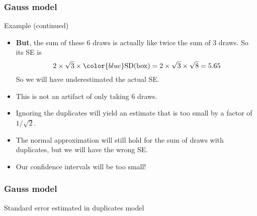 \documentclass[handout]{beamer}
\begin{document}
   \begin{frame} \frametitle{Gauss model}

   \begin{block}
     {Example (continued)}
     \begin{itemize}
     \item {\bf \color{red} But}, the sum of these 6 draws is actually like twice the
     sum of 3 draws. So its SE is
     $$
     2 \times \sqrt{3} \times {\color{blue} \text{SD(box)}} = 2 \times \sqrt{3} \times \sqrt{8} = 5.65
     $$
     So we will have underestimated the actual SE.

     \item This is not an artifact of only taking 6 draws.
     \item Ignoring the duplicates will yield an estimate that is too
     small by a factor of $1/\sqrt{2}$.
     \item The normal approximation will still hold for the sum
       of draws with duplicates, but we will have the wrong SE.
     \item Our confidence intervals will be too small!
     \end{itemize}
   \end{block}
   \end{frame}



   \begin{frame}
   \frametitle{Gauss model}
   \begin{center}
   \end{center}
   Standard error estimated in duplicates model
   \end{frame}


   \begin{frame} 

   \end{frame}

   
\end{document}
